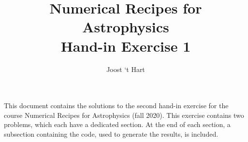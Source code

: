 \documentclass[a4paper,10pt]{article}
\title{Numerical Recipes for Astrophysics \\Hand-in Exercise 1}
\author{Joost `t Hart}
\begin{document}
\maketitle
\noindent
This document contains the solutions to the second hand-in exercise for the course Numerical Recipes for Astrophysics (fall 2020).  This exercise contains two problems, which each have a dedicated section. At the end of each section, a subsection containing the code, used to generate the results, is included.




\end{document}

